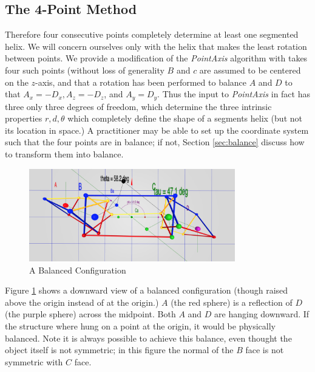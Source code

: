 \documentclass[11pt]{article}
\begin{document}
{\subsection{The 4-Point Method}

Therefore four consecutive points completely determine at least one segmented helix. We will concern ourselves
only with the helix that makes the least rotation between points.
We provide a modification of the {\em PointAxis} algorithm
with takes four such points (without loss of generality $B$ and $c$ are assumed to be centered on the $z$-axis, and that a
rotation has been performed to balance $A$ and $D$ to that $A_x = -D_x, A_z = -D_z$, and $A_y = D_y$. Thus the input to
{\em PointAxis} in fact has three only three degrees of freedom, which determine the three intrinsic properties $r,d,\theta$
which completely define the shape of a segments helix (but not its location in space.) A practitioner may be able to set up
the coordinate system such that the four points are in balance;
if not, Section \ref{sec:balance} discuss how to transform them
into balance.

\begin{figure}
     \centering
     \includegraphics[width=0.80\textwidth]{figures/Balance.png}
     \caption{A Balanced Configuration}
  \label{fig:balancediagram}
\end{figure}

Figure \ref{fig:balancediagram} shows a downward view of a balanced configuration (though raised above the origin
instead of at the origin.) $A$ (the red sphere) is a reflection of $D$ (the purple sphere) across
the midpoint. Both $A$ and $D$ are hanging downward. If the structure where hung on a point at the origin, it would
be physically balanced. Note it is always possible to achieve this balance, even thought the object
itself is not symmetric; in this figure the normal of the $B$ face is not symmetric with $C$ face.


}
\end{document}

